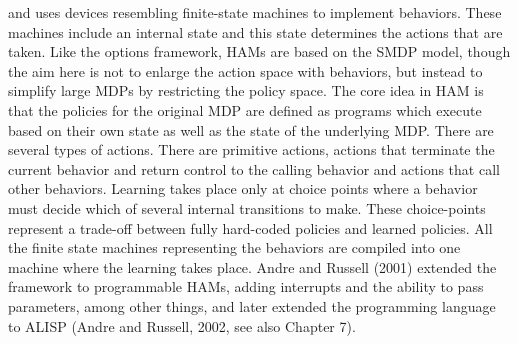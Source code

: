 and uses devices resembling finite-state machines
to implement behaviors. These machines
include an internal state and this state
determines the actions that are taken. Like
the options framework, HAMs are based on
the SMDP model, though the aim here is not
to enlarge the action space with behaviors, but instead to simplify large MDPs by restricting
the policy space. The core idea in HAM is that the policies for the original MDP are
defined as programs which execute based on their own state as well as the state of the
underlying MDP. There are several types of actions. There are primitive actions, actions
that terminate the current behavior and return control to the calling behavior and actions
that call other behaviors. Learning takes place only at choice points where a behavior
must decide which of several internal transitions to make. These choice-points represent
a trade-off between fully hard-coded policies and learned policies. All the finite state machines
representing the behaviors are compiled into one machine where the learning takes
place. Andre and Russell (2001) extended the framework to programmable HAMs, adding
interrupts and the ability to pass parameters, among other things, and later extended the
programming language to ALISP (Andre and Russell, 2002, see also Chapter 7).



